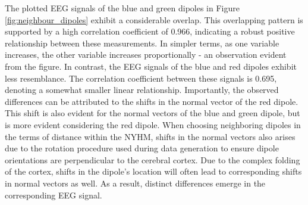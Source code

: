 \documentclass[a4paper, UKenglish, 11pt]{uiomaster}
\begin{document}
The plotted EEG signals of the blue and green dipoles in Figure \ref{fig:neighbour_dipoles} exhibit a considerable overlap. This overlapping pattern is supported by a high correlation coefficient of 0.966, indicating a robust positive relationship between these measurements. In simpler terms, as one variable increases, the other variable increases proportionally - an observation evident from the figure. In contrast, the EEG signals of the blue and red dipoles exhibit less resemblance. The correlation coefficient between these signals is 0.695, denoting a somewhat smaller linear relationship. Importantly, the observed differences can be attributed to the shifts in the normal vector of the red dipole. This shift is also evident for the normal vectors of the blue and green dipole, but is more evident considering the red dipole. When choosing neighboring dipoles in the terms of distance within the NYHM, shifts in the normal vectors also arises due to the rotation procedure used during data generation to ensure dipole orientations are perpendicular to the cerebral cortex. Due to the complex folding of the cortex, shifts in the dipole's location will often lead to corresponding shifts in normal vectors as well. As a result, distinct differences emerge in the corresponding EEG signal.

\end{document}
